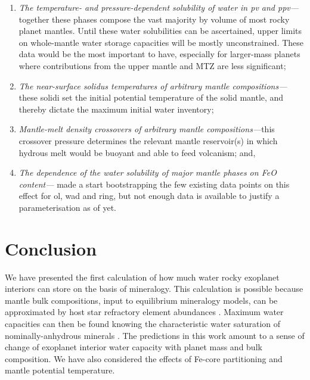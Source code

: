 \documentclass[fleqn,usenatbib]{mnras}
\begin{document}
\begin{enumerate}
    \item \textit{The temperature- and pressure-dependent solubility of water in pv and ppv---}together these phases compose the vast majority by volume of most rocky planet mantles. Until these water solubilities can be ascertained, upper limits on whole-mantle water storage capacities will be mostly unconstrained. These data would be the most important to have, especially for larger-mass planets where contributions from the upper mantle and MTZ are less significant; 
    \item \textit{The near-surface solidus temperatures of arbitrary mantle compositions---}these solidi set the initial potential temperature of the solid mantle, and thereby dictate the maximum initial water inventory;
    \item \textit{Mantle-melt density crossovers of arbitrary mantle compositions---}this crossover pressure determines the relevant mantle reservoir(s) in which hydrous melt would be buoyant and able to feed volcanism; and,
    \item \textit{The dependence of the water solubility of major mantle phases on FeO content---}\citet{dong_water_2022} made a start bootstrapping the few existing data points on this effect for ol, wad and ring, but not enough data is available to justify a parameterisation as of yet. 
\end{enumerate}





\section{Conclusion}

We have presented the first calculation of how much water rocky exoplanet interiors can store on the basis of mineralogy. This calculation is possible because mantle bulk compositions, input to equilibrium mineralogy models, can be approximated by host star refractory element abundances \citep{anders_solar-system_1982, thiabaud_elemental_2015, bonsor_host-star_2021}. Maximum water capacities can then be found knowing the characteristic water saturation of nominally-anhydrous minerals \citep{keppler_thermodynamics_2006}. The predictions in this work amount to a sense of change of exoplanet interior water capacity with planet mass and bulk composition. We have also considered the effects of Fe-core partitioning and mantle potential temperature.
\end{document}
